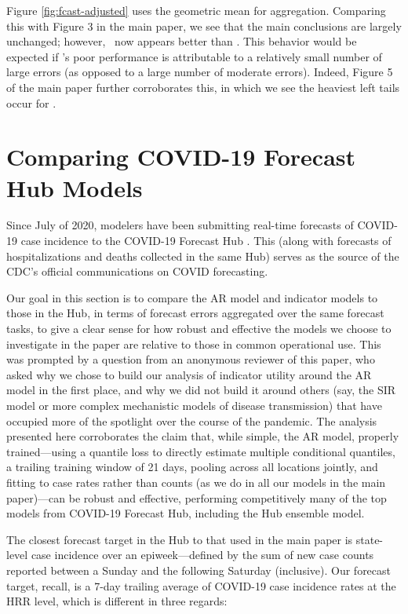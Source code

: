 Figure \ref{fig:fcast-adjusted} uses the geometric mean for aggregation.
Comparing this with Figure 3 in the main paper, we see that the main conclusions
are largely unchanged; however, \chngcli~now appears better than \ar.  This
behavior would be expected if \chngcli's poor performance is attributable to a
relatively small number of large errors (as opposed to a large number of
moderate errors).  Indeed, Figure 5 of the main paper further corroborates this,
in which we see the heaviest left tails occur for \chngcli.

\section{Comparing COVID-19 Forecast Hub Models}

Since July of 2020, modelers have been submitting real-time forecasts of
COVID-19 case incidence to the COVID-19 Forecast Hub \cite{ForecastHub}. This 
(along with forecasts of hospitalizations and deaths collected in the same Hub)
serves as the source of the CDC's official communications on COVID forecasting. 

Our goal in this section is to compare the AR model and indicator models to
those in the Hub, in terms of forecast errors aggregated over the same forecast
tasks, to give a clear sense for how robust and effective the models we choose
to investigate in the paper are relative to those in common operational use.
This was prompted by a question from an anonymous reviewer of this paper, who
asked why we chose to build our analysis of indicator utility around the AR
model in the first place, and why we did not build it around others (say, the
SIR model or more complex mechanistic models of disease transmission) that have 
occupied more of the spotlight over the course of the pandemic.  The analysis
presented here corroborates the claim that, while simple, the AR model, properly
trained---using a quantile loss to directly estimate multiple conditional
quantiles, a trailing training window of 21 days, pooling across all locations
jointly, and fitting to case rates rather than counts (as we do in all our
models in the main paper)---can be robust and effective, performing
competitively many of the top models from COVID-19 Forecast Hub, including the
Hub ensemble model.

The closest forecast target in the Hub to that used in the main paper is 
state-level case incidence over an epiweek---defined by the sum of new case
counts reported between a Sunday and the following Saturday (inclusive). Our
forecast target, recall, is a 7-day trailing average of COVID-19 case incidence
rates at the HRR level, which is different in three regards:

